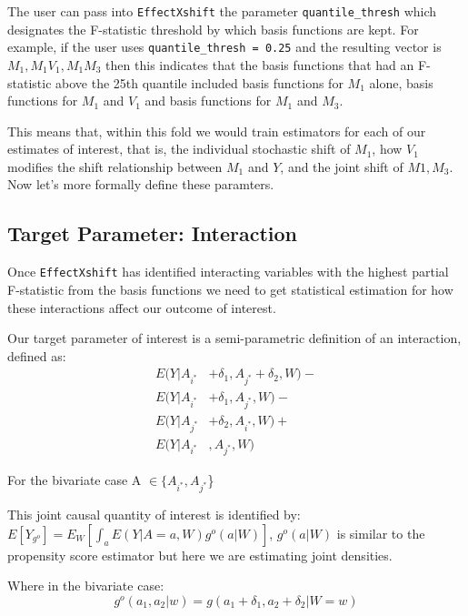 \documentclass[
]{article}
\begin{document}
The user can pass into \texttt{EffectXshift} the parameter
\texttt{quantile\_thresh} which designates the F-statistic threshold by
which basis functions are kept. For example, if the user uses
\texttt{quantile\_thresh\ =\ 0.25} and the resulting vector is
\(M_1, M_1V_1, M_1M_3\) then this indicates that the basis functions
that had an F-statistic above the 25th quantile included basis functions
for \(M_1\) alone, basis functions for \(M_1\) and \(V_1\) and basis
functions for \(M_1\) and \(M_3\).

This means that, within this fold we would train estimators for each of
our estimates of interest, that is, the individual stochastic shift of
\(M_1\), how \(V_1\) modifies the shift relationship between \(M_1\) and
\(Y\), and the joint shift of \(M1,M_3\). Now let's more formally define
these paramters.

\hypertarget{target-parameter-interaction}{%
\subsection{Target Parameter:
Interaction}\label{target-parameter-interaction}}

Once \texttt{EffectXshift} has identified interacting variables with the
highest partial F-statistic from the basis functions we need to get
statistical estimation for how these interactions affect our outcome of
interest.

Our target parameter of interest is a semi-parametric definition of an
interaction, defined as: \begin{equation} \label{eq1}
\begin{split}
E(Y|A_{i^*} &+ \delta_1, A_{j^*} + \delta_2, W) - \\ 
E(Y|A_{i^*} &+ \delta_1, A_{j^*}, W) - \\ 
E(Y|A_{j^*} &+ \delta_2,  A_{i^*}, W) + \\
E(Y|A_{i^*}&, A_{j^*}, W) 
\end{split}
\end{equation}

For the bivariate case A \(\in \{A_{i^*}, A_{j^*}\)\}

This joint causal quantity of interest is identified by:
\(E[Y_{g^o}] = E_W [\int_a E(Y|A=a, W)g^o(a|W)]\), \(g^o(a|W)\) is
similar to the propensity score estimator but here we are estimating
joint densities.

Where in the bivariate case:
\[g^o(a_1, a_2|w) = g(a_1 + \delta_1, a_2 + \delta_2|W = w)\]
\end{document}
